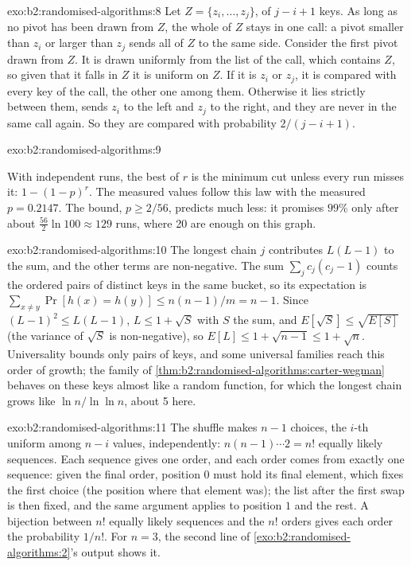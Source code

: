 \begin{solution}{exo:b2:randomised-algorithms:8}
Let $Z = \{z_i, \dots, z_j\}$, of $j - i + 1$ keys. As long as no pivot has been drawn from $Z$, the whole of $Z$ stays in
one call: a pivot smaller than $z_i$ or larger than $z_j$ sends all of $Z$ to the same side. Consider the first pivot
drawn from $Z$. It is drawn uniformly from the list of the call, which contains $Z$, so given that it falls in $Z$ it is
uniform on $Z$. If it is $z_i$ or $z_j$, it is compared with every key of the call, the other one among them. Otherwise
it lies strictly between them, sends $z_i$ to the left and $z_j$ to the right, and they are never in the same call
again. So they are compared with probability $2/(j - i + 1)$.
\end{solution}

\begin{solution}{exo:b2:randomised-algorithms:9}

With independent runs, the best of $r$ is the minimum cut unless every run misses it: $1 - (1 - p)^r$. The measured
values follow this law with the measured $p = 0.2147$. The bound, $p \geq 2/56$, predicts much less: it promises $99\%$ only
after about $\frac{56}{2} \ln 100 \approx 129$ runs, where 20 are enough on this graph.
\end{solution}

\begin{solution}{exo:b2:randomised-algorithms:10}
The longest chain $j$ contributes $L(L - 1)$ to the sum, and the other terms are non-negative. The sum $\sum_j c_j(c_j -
1)$ counts the ordered pairs of distinct keys in the same bucket, so its expectation is $\sum_{x \neq y} \Pr[h(x) =
h(y)] \leq n(n - 1)/m = n - 1$. Since $(L - 1)^2 \leq L(L - 1)$, $L \leq 1 + \sqrt{S}$ with $S$ the sum, and
$E[\sqrt{S}] \leq \sqrt{E[S]}$ (the variance of $\sqrt{S}$ is non-negative), so $E[L] \leq 1 + \sqrt{n - 1} \leq 1 +
\sqrt{n}$. Universality bounds only pairs of keys, and some universal families reach this order of growth; the family of
\cref{thm:b2:randomised-algorithms:carter-wegman} behaves on these keys almost like a random function, for which the
longest chain grows like $\ln n / \ln \ln n$, about 5 here.
\end{solution}

\begin{solution}{exo:b2:randomised-algorithms:11}
The shuffle makes $n - 1$ choices, the $i$-th uniform among $n - i$ values, independently: $n(n - 1) \cdots 2 = n!$
equally likely sequences. Each sequence gives one order, and each order comes from exactly one sequence: given the final
order, position $0$ must hold its final element, which fixes the first choice (the position where that element was);
the list after the first swap is then fixed, and the same argument applies to position $1$ and the rest. A bijection
between $n!$ equally likely sequences and the $n!$ orders gives each order the probability $1/n!$. For $n = 3$, the
second line of \cref{exo:b2:randomised-algorithms:2}'s output shows it.
\end{solution}

